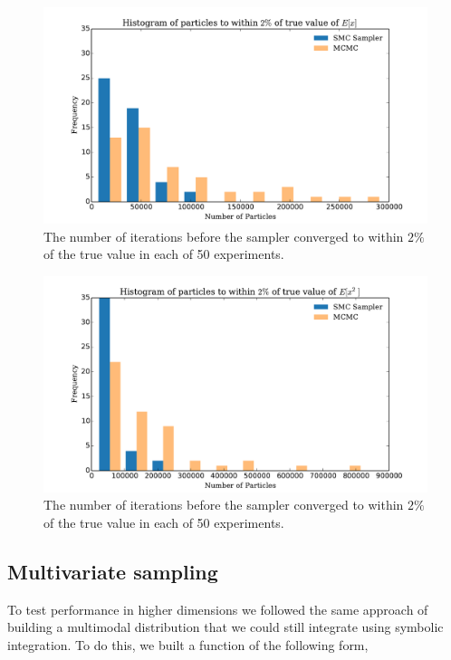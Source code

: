 \documentclass[12pt]{elsarticle}
\begin{document}
\begin{figure}[htbp]
\begin{center}
\includegraphics[width = \textwidth]{plots/iterations.pdf}
\caption{The number of iterations before the sampler converged to within $2\%$ of the true value in each of 50 experiments.}
\label{fig:itersEX}
\end{center}
\end{figure}

\begin{figure}[htbp]
\begin{center}
\includegraphics[width = \textwidth]{plots/iterationsEx2.pdf}
\caption{The number of iterations before the sampler converged to within $2\%$ of the true value in each of 50 experiments.}
\label{fig:itersEX2}
\end{center}
\end{figure}

\subsection*{Multivariate sampling}
To test performance in higher dimensions we followed the same approach of building a multimodal distribution that we could still integrate using symbolic integration. To do this, we built a function of the following form,
\end{document}
